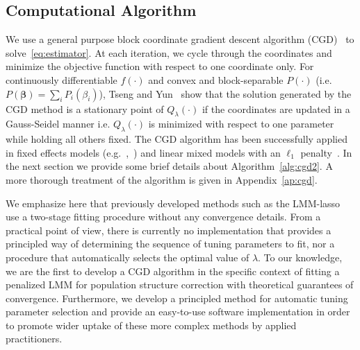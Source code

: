 \documentclass[12pt,letter]{article}\usepackage[]{graphicx}\usepackage[]{color}
\newcommand{\bbeta}{\boldsymbol{\beta}}
\begin{document}
\subsection{Computational Algorithm} \label{sec:section3}


We use a general purpose block coordinate gradient descent algorithm (CGD)~\citep{tseng2009coordinate} to solve~\eqref{eq:estimator}. At each iteration, we cycle through the coordinates and minimize the objective function with respect to one coordinate only. For continuously differentiable $f(\cdot)$ and convex and block-separable $P(\cdot)$ \mbox{(i.e. $P(\bbeta) = \sum_i P_i (\beta_i)$)}, Tseng and Yun~\cite{tseng2009coordinate} show that the solution generated by the CGD method is a stationary point of $Q_{\lambda}(\cdot)$ if the coordinates are updated in a Gauss-Seidel manner i.e. $Q_{\lambda}(\cdot)$ is minimized with respect to one parameter while holding all others fixed. The CGD algorithm has been successfully applied in fixed effects models (e.g.~\cite{meier2008group},~\cite{friedman2010regularization}) and linear mixed models with an $\ell_1$ penalty~\cite{schelldorfer2011estimation}. In the next section we provide some brief details about Algorithm~\ref{alg:cgd2}. A more thorough treatment of the algorithm is given in Appendix~\ref{ap:cgd}.

We emphasize here that previously developed methods such as the LMM-lasso~\citep{rakitsch2013lasso} use a two-stage fitting procedure without any convergence details.
From a practical point of view, there is currently no implementation that provides a principled way of determining the sequence of tuning parameters to fit, nor a procedure that automatically selects the optimal value of $\lambda$.
To our knowledge, we are the first to develop a CGD algorithm in the specific context of fitting a penalized LMM for population structure correction with theoretical guarantees of convergence. Furthermore, we develop a principled method for automatic tuning parameter selection and provide an easy-to-use software implementation in order to promote wider uptake of these more complex methods by applied practitioners.
\end{document}
